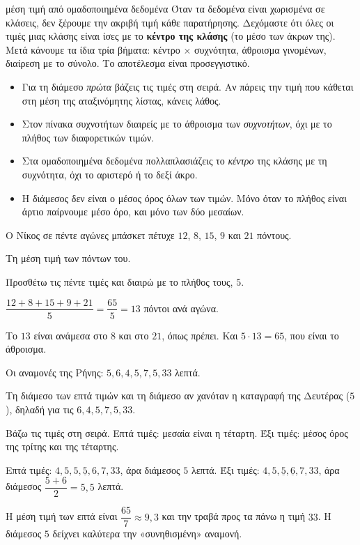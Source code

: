 \begin{kanonas}{μέση τιμή από ομαδοποιημένα δεδομένα}
Όταν τα δεδομένα είναι χωρισμένα σε κλάσεις, δεν ξέρουμε την ακριβή τιμή κάθε παρατήρησης. Δεχόμαστε ότι όλες οι τιμές μιας κλάσης είναι ίσες με το \textbf{κέντρο της κλάσης} (το μέσο των άκρων της). Μετά κάνουμε τα ίδια τρία βήματα: κέντρο $\times$ συχνότητα, άθροισμα γινομένων, διαίρεση με το σύνολο. Το αποτέλεσμα είναι προσεγγιστικό.
\end{kanonas}

\begin{prosoxi}
\begin{itemize}[leftmargin=1.2em,itemsep=0.3ex,topsep=2pt]
\item Για τη διάμεσο \emph{πρώτα} βάζεις τις τιμές στη σειρά. Αν πάρεις την τιμή που κάθεται στη μέση της αταξινόμητης λίστας, κάνεις λάθος.
\item Στον πίνακα συχνοτήτων διαιρείς με το άθροισμα των \emph{συχνοτήτων}, όχι με το πλήθος των διαφορετικών τιμών.
\item Στα ομαδοποιημένα δεδομένα πολλαπλασιάζεις το \emph{κέντρο} της κλάσης με τη συχνότητα, όχι το αριστερό ή το δεξί άκρο.
\item Η διάμεσος δεν είναι ο μέσος όρος όλων των τιμών. Μόνο όταν το πλήθος είναι άρτιο παίρνουμε μέσο όρο, και μόνο των δύο μεσαίων.
\end{itemize}
\end{prosoxi}


\tixero Ο Νίκος σε πέντε αγώνες μπάσκετ πέτυχε $12$, $8$, $15$, $9$ και $21$ πόντους.\par
\tithelo Τη μέση τιμή των πόντων του.\par
\possindeo Προσθέτω τις πέντε τιμές και διαιρώ με το πλήθος τους, $5$.\par
\apantisi $\dfrac{12+8+15+9+21}{5}=\dfrac{65}{5}=13$ πόντοι ανά αγώνα.\par
\elegxos Το $13$ είναι ανάμεσα στο $8$ και στο $21$, όπως πρέπει. Και $5\cdot13=65$, που είναι το άθροισμα.

\tixero Οι αναμονές της Ρήνης: $5, 6, 4, 5, 7, 5, 33$ λεπτά.\par
\tithelo Τη διάμεσο των επτά τιμών και τη διάμεσο αν χανόταν η καταγραφή της Δευτέρας ($5$), δηλαδή για τις $6, 4, 5, 7, 5, 33$.\par
\possindeo Βάζω τις τιμές στη σειρά. Επτά τιμές: μεσαία είναι η τέταρτη. Έξι τιμές: μέσος όρος της τρίτης και της τέταρτης.\par
\apantisi Επτά τιμές: $4, 5, 5, \underline{5}, 6, 7, 33$, άρα διάμεσος $5$ λεπτά. Έξι τιμές: $4, 5, \underline{5}, \underline{6}, 7, 33$, άρα διάμεσος $\dfrac{5+6}{2}=5{,}5$ λεπτά.\par
\elegxos Η μέση τιμή των επτά είναι $\dfrac{65}{7}\approx 9{,}3$ και την τραβά προς τα πάνω η τιμή $33$. Η διάμεσος $5$ δείχνει καλύτερα την «συνηθισμένη» αναμονή.

